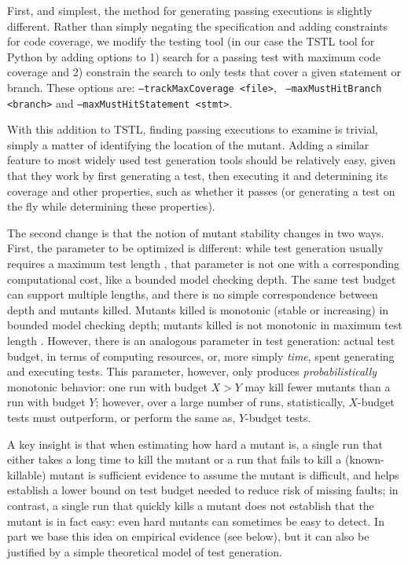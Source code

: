\documentclass{svjour3}
\begin{document}
First, and simplest, the method for generating passing executions is
slightly different.  Rather than simply negating the specification and
adding constraints for code coverage, we modify the testing tool (in
our case the TSTL tool for Python \cite{tstlsttt,NFM15} by adding
options to 1) search for a passing test with maximum code coverage and
2) constrain the search to only tests that cover a given statement or
branch.  These options are:  {\tt --trackMaxCoverage <file>}, {\tt
  --maxMustHitBranch <branch>} and {\tt --maxMustHitStatement <stmt>}.

With this addition to TSTL, finding passing executions to examine is
trivial, simply a matter of identifying the location of the mutant.
Adding a similar feature to most widely used test generation tools
should be relatively easy, given that they work by first generating a test, then
executing it and determining its coverage and other properties, such as
whether it passes (or generating a test on the fly while determining
these properties).  

The second change is that the notion of mutant stability changes in
two ways.  First, the parameter to be optimized is different:  while
test generation usually requires a maximum test length \cite{ASE08},
that parameter is not one with a corresponding computational cost,
like a bounded model checking depth.  The same test budget can support
multiple lengths, and there is no simple correspondence between depth
and mutants killed.  Mutants killed is monotonic (stable or
increasing) in bounded model checking depth; mutants killed is not
monotonic in maximum test length \cite{ASE08}.  However, there is an
analogous parameter in test generation:  actual test budget, in terms
of computing resources, or, more simply \emph{time}, spent generating
and executing tests.  This
parameter, however, only produces \emph{probabilistically} \cite{arcuri2014hitchhiker} monotonic
behavior:  one run with budget $X > Y$ may kill fewer mutants than a
run with budget $Y$; however, over a large number of runs,
statistically, $X$-budget tests must outperform, or perform the same
as, $Y$-budget tests.

A key insight is that when estimating how hard a mutant is, a single
run that either takes a long time to kill the mutant or a run that
fails to kill a (known-killable) mutant is sufficient evidence to
assume the mutant is difficult, and helps establish a lower bound on
test budget needed to reduce risk of missing faults; in contrast, a
single run that quickly kills a mutant does not establish that the
mutant is in fact easy:  even hard mutants can sometimes be easy to
detect.  In part we base this idea on empirical evidence (see below),
but it can also be justified by a simple theoretical model of test
generation.  
\end{document}
